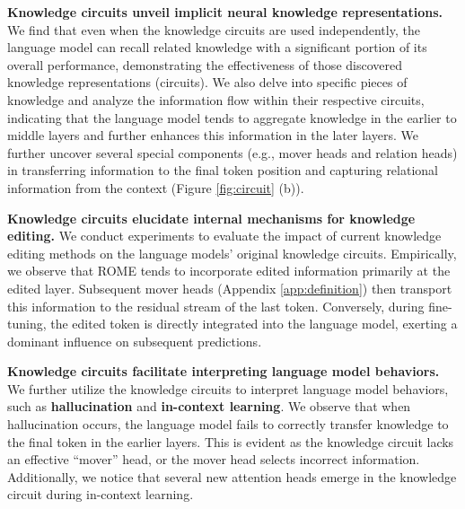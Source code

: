 \documentclass{article}
\begin{document}
%

\textbf{Knowledge circuits unveil implicit neural knowledge representations.}
We find that even when the knowledge circuits are used independently, the language model can recall related knowledge with a significant portion of its overall performance, demonstrating the effectiveness of those discovered knowledge representations (circuits).
We also delve into specific pieces of knowledge and analyze the information flow within their respective circuits, indicating that the language model tends to aggregate knowledge in the earlier to middle layers and further enhances this information in the later layers.
We further uncover several special components (e.g., mover heads and relation heads) in transferring information to the final token position and capturing relational information from the context (Figure \ref{fig:circuit} (b)).


\textbf{Knowledge circuits elucidate internal mechanisms for knowledge editing.} 
We conduct experiments to evaluate the impact of current knowledge editing methods on the language models' original knowledge circuits. 
Empirically, we observe that ROME \cite{meng2022locating} tends to incorporate edited information primarily at the edited layer. Subsequent mover heads (Appendix \ref{app:definition}) then transport this information to the residual stream of the last token.
Conversely, during fine-tuning, the edited token is directly integrated into the language model, exerting a dominant influence on subsequent predictions. 


\textbf{Knowledge circuits facilitate interpreting language model behaviors.} 
We further utilize the knowledge circuits to interpret language model behaviors, such as \textbf{hallucination} and \textbf{in-context learning}.
We observe that when hallucination occurs, the language model fails to correctly transfer knowledge to the final token in the earlier layers.
This is evident as the knowledge circuit lacks an effective ``mover'' head, or the mover head selects incorrect information.
Additionally, we notice that several new attention heads emerge in the knowledge circuit during in-context learning.





\end{document}
